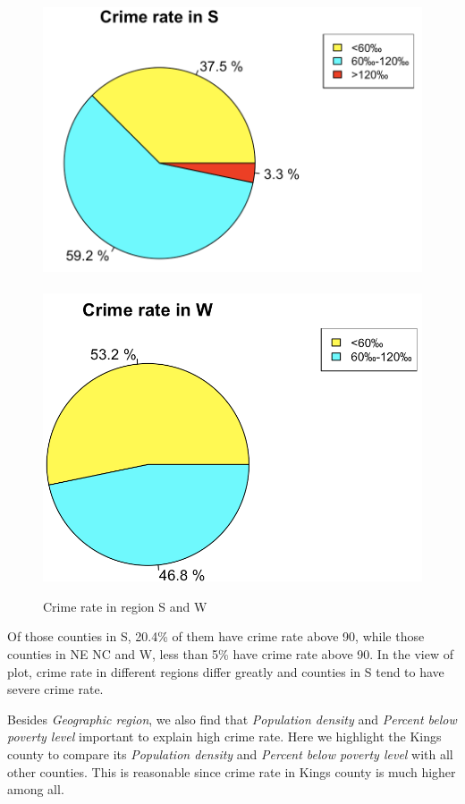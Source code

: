 \documentclass[oneside,11pt]{homework}
\begin{document}
\begin{figure}[H]
\centering
\includegraphics[scale=0.35]{S.png}~~~~~
\includegraphics[scale=0.35]{W.png}
\caption{Crime rate in region S and W} 
\end{figure}
Of those counties in S, 20.4\% of them have crime rate above 90\textperthousand{}, while those counties in NE NC and W, less than 5\% have crime rate above 90\textperthousand{}. In the view of plot, crime rate in different regions differ greatly and counties in S tend to have severe crime rate.\par
Besides \textit{Geographic region}, we also find that \textit{Population density} and \textit{Percent below poverty level} important to explain high crime rate. Here we highlight the Kings county to compare its \textit{Population density} and \textit{Percent below poverty level} with all other counties. This is reasonable since crime rate in Kings county is much higher among all.
\end{document}
